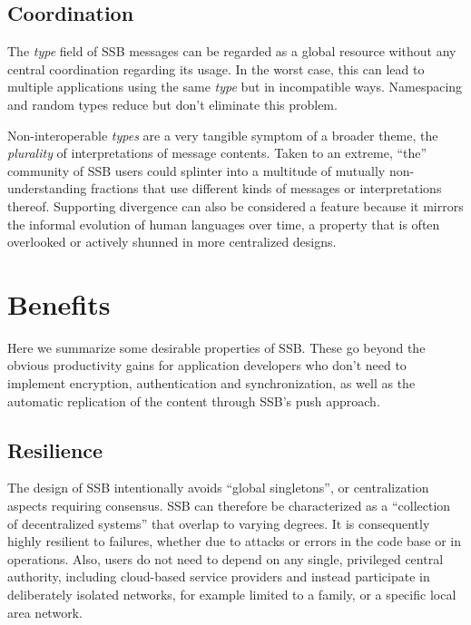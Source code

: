 \documentclass[9pt,sigconf]{acmart}
\begin{document}
\subsection{Coordination}

The \textit{type} field of SSB messages can be regarded as a global
resource without any central coordination regarding its usage. In the
worst case, this can lead to multiple applications using the same
\textit{type} but in incompatible ways. Namespacing and random types
reduce but don't eliminate this problem.

Non-interoperable \textit{types} are a very tangible symptom of a
broader theme, the \textit{plurality} of interpretations of message
contents. Taken to an extreme, ``the'' community of SSB users could
splinter into a multitude of mutually non-understanding fractions that
use different kinds of messages or interpretations thereof. Supporting
divergence can also be considered a feature because it mirrors the
informal evolution of human languages over time, a property that is
often overlooked or actively shunned in more centralized designs.



\section{Benefits}
\label{sect:yay}

Here we summarize some desirable properties of SSB. These go beyond
the obvious productivity gains for application developers who don't
need to implement encryption, authentication and synchronization, as
well as the automatic replication of the content through SSB's push
approach.

\subsection{Resilience}

The design of SSB intentionally avoids ``global singletons'', or
centralization aspects requiring consensus. SSB can therefore be
characterized as a ``collection of decentralized systems'' that
overlap to varying degrees. It is consequently highly resilient to
failures, whether due to attacks or errors in the code base or in
operations. Also, users do not need to depend on any single,
privileged central authority, including cloud-based service providers
and instead participate in deliberately isolated networks, for example
limited to a family, or a specific local area network.
\end{document}
